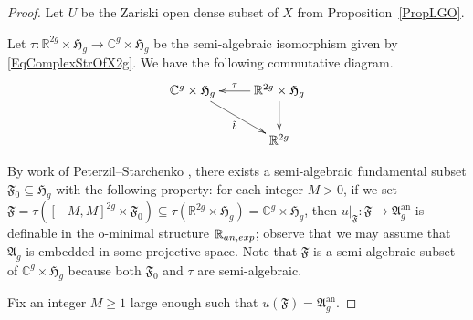 \documentclass[12pt,oneside]{amsart}
\numberwithin{maincounter}{section}
\numberwithin{equation}{section}
\def\RR{\mathbb{R}}
\def\CC{\mathbb{C}}
\def\ZZ{\mathbb{Z}}
\def\QQ{\mathbb{Q}}
\newcommand{\IC}{{\CC}}
\newcommand{\IR}{{\RR}}
\newcommand{\IRanexp}{{{\RR}_{\rm an,exp}}}
\newcommand{\IZ}{{\ZZ}}
\newcommand{\IQ}{{\QQ}}
\begin{document}
\begin{proof} Let $U$ be the Zariski open dense subset of $X$ from Proposition~\ref{PropLGO}.



  
Let $\tau \colon \IR^{2g} \times \mathfrak{H}_g \rightarrow \IC^g \times \mathfrak{H}_g$ be the semi-algebraic isomorphism given by \eqref{EqComplexStrOfX2g}. We have the following commutative diagram.%
\[
\xymatrix{
\IC^g \times \mathfrak{H}_g \ar[rd]_-{\tilde{b}} & \IR^{2g} \times \mathfrak{H}_g \ar[l]_-{\tau} \ar[d] \\
 & \IR^{2g}
}
\]






By work of Peterzil--Starchenko
\cite{PeterzilStarchenkoDefinabilityTheta}, there exists a
semi-algebraic fundamental subset $\mathfrak{F}_0 \subseteq
\mathfrak{H}_g$ with the following property: for each integer $M > 0$,
if we set $\mathfrak{F} = \tau([-M,M]^{2g} \times \mathfrak{F}_0)
\subseteq \tau(\IR^{2g} \times \mathfrak{H}_g) = \IC^g \times
\mathfrak{H}_g$, then $u|_{\mathfrak{F}} \colon \mathfrak{F}
\rightarrow \mathfrak{A}_g^{\mathrm{an}}$ is  definable in the
o-minimal structure $\IRanexp$;
observe that we may assume that $\mathfrak{A}_g$ is embedded in some
projective space. %
Note that $\mathfrak{F}$ is a semi-algebraic subset of $\IC^g \times \mathfrak{H}_g$ because both $\mathfrak{F}_0$ and $\tau$ are semi-algebraic.

Fix an integer $M \ge 1$ large enough such that $u(\mathfrak{F}) = \mathfrak{A}_g^{\mathrm{an}}$.





\end{proof}
\end{document}
